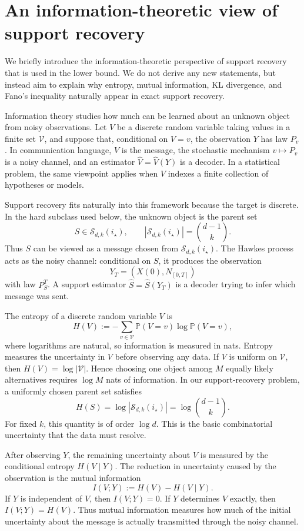\documentclass{article}
\newcommand{\Pbb}{\mathbb{P}}
\begin{document}
\section{An information-theoretic view of support recovery}
\label{app:it-intro}

We briefly introduce the information-theoretic perspective of support recovery that is used in the lower bound.
We do not derive any new statements, but instead aim to explain why entropy, mutual information, KL divergence, and Fano's inequality naturally appear in exact support recovery.

Information theory studies how much can be learned about an unknown object from noisy observations. Let \(V\) be a discrete random variable taking values in a finite set \(\mathcal V\), and suppose that, conditional on \(V=v\), the observation \(Y\) has law \(P_v\). In communication language, \(V\) is the message, the stochastic mechanism \(v\mapsto P_v\) is a noisy channel, and an estimator \(\widehat V=\widehat V(Y)\) is a decoder. In a statistical problem,
the same viewpoint applies when \(V\) indexes a finite collection of hypotheses or models.

Support recovery fits naturally into this framework because the target is discrete. In the hard subclass used below, the unknown object is the parent set
\[
  S\in\mathcal S_{d,k}(i_\star),
  \qquad
  |\mathcal S_{d,k}(i_\star)|=\binom{d-1}{k}.
\]
Thus \(S\) can be viewed as a message chosen from \(\mathcal S_{d,k}(i_\star)\). The Hawkes process acts as the noisy channel: conditional on \(S\), it produces the observation
\[
  Y_T=(X(0),N_{[0,T]})
\]
with law \(P_S^T\). A support estimator \(\widehat S=\widehat S(Y_T)\) is a decoder trying to infer which message was sent.

The entropy of a discrete random variable \(V\) is
\[
  H(V):=-\sum_{v\in\mathcal V}\Pbb(V=v)\log \Pbb(V=v),
\]
where logarithms are natural, so information is measured in nats.
Entropy measures the uncertainty in \(V\) before observing any data.
If \(V\) is uniform on \(\mathcal V\), then \(H(V)=\log|\mathcal V|\).
Hence choosing one object among \(M\) equally likely alternatives requires \(\log M\) nats of information. 
In our support-recovery problem, a uniformly chosen parent set satisfies
\[
  H(S)=\log |\mathcal S_{d,k}(i_\star)|
  =
  \log\binom{d-1}{k}.
\]
For fixed \(k\), this quantity is of order \(\log d\). This is the basic combinatorial uncertainty that the data must resolve.

After observing \(Y\), the remaining uncertainty about \(V\) is measured by the conditional entropy \(H(V\mid Y)\). The reduction in uncertainty caused by the observation is the mutual information
\[
  I(V;Y):=H(V)-H(V\mid Y).
\]
If \(Y\) is independent of \(V\), then \(I(V;Y)=0\). If \(Y\) determines \(V\) exactly, then \(I(V;Y)=H(V)\). Thus mutual information measures how much of the initial uncertainty about the message is actually transmitted through the noisy channel.
\end{document}
